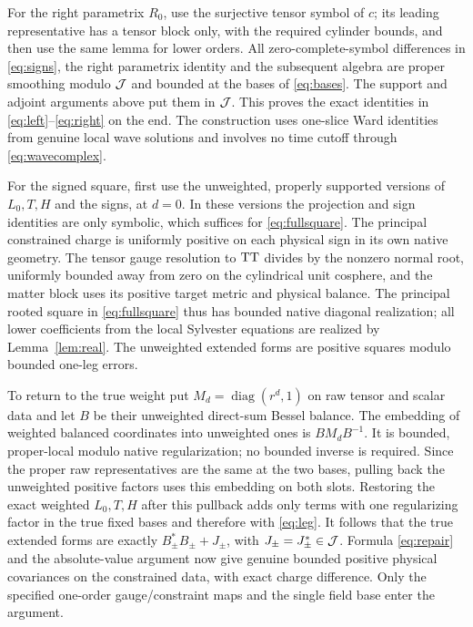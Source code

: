 For the right parametrix \(R_0\), use the surjective tensor symbol of \(c\); its leading representative has a tensor block only, with the required cylinder bounds, and then use the same lemma for lower orders. All zero-complete-symbol differences in \eqref{eq:signs}, the right parametrix identity and the subsequent algebra are proper smoothing modulo \(\mathcal J\) and bounded at the bases of \eqref{eq:bases}. The support and adjoint arguments above put them in \(\mathcal J\). This proves the exact identities in \eqref{eq:left}--\eqref{eq:right} on the end. The construction uses one-slice Ward identities from genuine local wave solutions and involves no time cutoff through \eqref{eq:wavecomplex}.

For the signed square, first use the unweighted, properly supported versions of \(L_0,T,H\) and the signs, at \(d=0\). In these versions the projection and sign identities are only symbolic, which suffices for \eqref{eq:fullsquare}. The principal constrained charge is uniformly positive on each physical sign in its own native geometry. The tensor gauge resolution to \(\mathrm{TT}\) divides by the nonzero normal root, uniformly bounded away from zero on the cylindrical unit cosphere, and the matter block uses its positive target metric and physical balance. The principal rooted square in \eqref{eq:fullsquare} thus has bounded native diagonal realization; all lower coefficients from the local Sylvester equations are realized by Lemma~\ref{lem:real}. The unweighted extended forms are positive squares modulo bounded one-leg errors.

To return to the true weight put \(M_d=\operatorname{diag}(r^d,1)\) on raw tensor and scalar data and let \(B\) be their unweighted direct-sum Bessel balance. The embedding of weighted balanced coordinates into unweighted ones is \(B M_d B^{-1}\). It is bounded, proper-local modulo native regularization; no bounded inverse is required. Since the proper raw representatives are the same at the two bases, pulling back the unweighted positive factors uses this embedding on both slots. Restoring the exact weighted \(L_0,T,H\) after this pullback adds only terms with one regularizing factor in the true fixed bases and therefore with \eqref{eq:leg}. It follows that the true extended forms are exactly \(B_\pm^*B_\pm+J_\pm\), with \(J_\pm=J_\pm^*\in\mathcal J\). Formula \eqref{eq:repair} and the absolute-value argument now give genuine bounded positive physical covariances on the constrained data, with exact charge difference. Only the specified one-order gauge/constraint maps and the single field base enter the argument.
